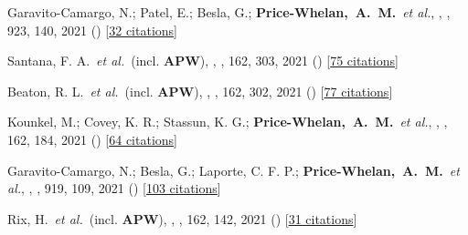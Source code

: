 \item[{\color{deemph}\scriptsize94}]Garavito-Camargo, N.; Patel, E.; Besla, G.; \textbf{Price-Whelan,~A.~M.}~\textit{et al.}, , \apj, 923, 140, 2021 () [\href{http://adsabs.harvard.edu/abs/2021ApJ...923..140G}{32 citations}]

\item[{\color{deemph}\scriptsize93}]Santana, F. A.~\textit{et al.}~(incl. \textbf{APW}), , \aj, 162, 303, 2021 () [\href{http://adsabs.harvard.edu/abs/2021AJ....162..303S}{75 citations}]

\item[{\color{deemph}\scriptsize92}]Beaton, R. L.~\textit{et al.}~(incl. \textbf{APW}), , \aj, 162, 302, 2021 () [\href{http://adsabs.harvard.edu/abs/2021AJ....162..302B}{77 citations}]

\item[{\color{deemph}\scriptsize91}]Kounkel, M.; Covey, K. R.; Stassun, K. G.; \textbf{Price-Whelan,~A.~M.}~\textit{et al.}, , \aj, 162, 184, 2021 () [\href{http://adsabs.harvard.edu/abs/2021AJ....162..184K}{64 citations}]

\item[{\color{deemph}\scriptsize90}]Garavito-Camargo, N.; Besla, G.; Laporte, C. F. P.; \textbf{Price-Whelan,~A.~M.}~\textit{et al.}, , \apj, 919, 109, 2021 () [\href{http://adsabs.harvard.edu/abs/2021ApJ...919..109G}{103 citations}]

\item[{\color{deemph}\scriptsize89}]Rix, H.~\textit{et al.}~(incl. \textbf{APW}), , \aj, 162, 142, 2021 () [\href{http://adsabs.harvard.edu/abs/2021AJ....162..142R}{31 citations}]

